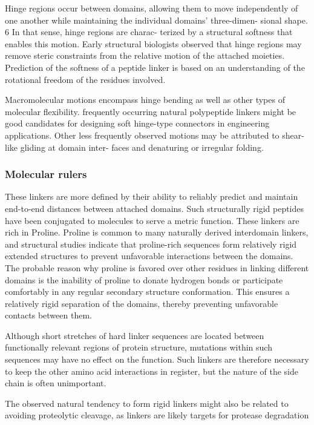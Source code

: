 Hinge regions occur between domains, allowing
them to move independently of one another while
maintaining the individual domains’ three-dimen-
sional shape. 6 In that sense, hinge regions are charac-
terized by a structural softness that enables this
motion.
Early structural biologists observed that
hinge regions may remove steric constraints from the
relative motion of the attached moieties.
Prediction of the softness of a peptide linker is
based on an understanding of the rotational freedom
of the residues involved.

Macromolecular motions encompass hinge bending
as well as other types of molecular flexibility.
frequently occurring natural
polypeptide linkers might be good candidates for
designing soft hinge-type connectors in engineering
applications. Other less frequently observed motions
may be attributed to shear-like gliding at domain inter-
faces and denaturing or irregular folding.



\subsubsection{Molecular rulers}
These linkers are more defined by their ability to reliably predict and maintain end-to-end distances between attached domains. 
Such structurally rigid peptides have been conjugated to molecules to serve a metric function.
These linkers are rich in Proline. 
Proline is common to many naturally derived interdomain linkers, and structural studies indicate that proline-rich sequences form relatively rigid extended structures to prevent unfavorable interactions between the domains.
The probable reason why proline is favored over other residues in linking different domains is the inability of proline to donate hydrogen bonds or participate comfortably in any regular secondary structure conformation. This ensures a relatively rigid separation of the domains, thereby preventing unfavorable contacts between them.

Although short stretches of hard linker sequences are located between functionally relevant regions of protein structure, mutations within such sequences may have no effect on the function.  
Such linkers are therefore necessary to keep the other amino acid interactions in register, but the nature of the side chain is often unimportant.

The observed natural tendency to form rigid linkers might also
be related to avoiding proteolytic cleavage, as linkers are likely
targets for protease degradation

